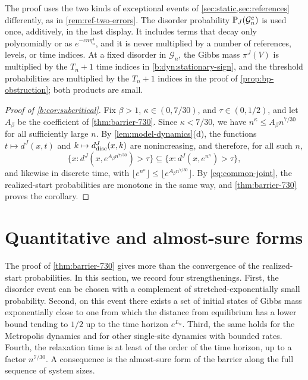 The proof uses the two kinds of exceptional events of \cref{sec:static,sec:references} differently, as in \cref{rem:ref-two-errors}. The disorder probability $\mathbb P_J(\mathcal G_n^c)$ is used once, additively, in the last display. It includes terms that decay only polynomially or as $e^{-cn\eta_n^4}$, and it is never multiplied by a number of references, levels, or time indices. At a fixed disorder in $\mathcal G_n$, the Gibbs mass $\pi^J(V)$ is multiplied by the $T_n+1$ time indices in \eqref{b:dyn:stationary-sign}, and the threshold probabilities are multiplied by the $T_n+1$ indices in the proof of \cref{prop:bp-obstruction}; both products are small.

\begin{proof}[Proof of \cref{b:cor:subcritical}]
Fix $\beta>1$, $\kappa\in(0,7/30)$, and $\tau\in(0,1/2)$, and let $A_\beta$ be the coefficient of \cref{thm:barrier-730}. Since $\kappa<7/30$, we have $n^\kappa\le A_\beta n^{7/30}$ for all sufficiently large $n$. By \cref{lem:model-dynamics}(d), the functions $t\mapsto d^J(x,t)$ and $k\mapsto d^J_{\rm disc}(x,k)$ are nonincreasing, and therefore, for all such $n$,
\[
 \bigl\{x:d^J(x,e^{A_\beta n^{7/30}})>\tau\bigr\}\subseteq\bigl\{x:d^J(x,e^{n^\kappa})>\tau\bigr\},
\]
and likewise in discrete time, with $\lfloor e^{n^\kappa}\rfloor\le\lfloor e^{A_\beta n^{7/30}}\rfloor$. By \eqref{eq:common-joint}, the realized-start probabilities are monotone in the same way, and \cref{thm:barrier-730} proves the corollary.
\end{proof}

\section{Quantitative and almost-sure forms}\label{sec:bp-strong}

The proof of \cref{thm:barrier-730} gives more than the convergence of the realized-start probabilities. In this section, we record four strengthenings. First, the disorder event can be chosen with a complement of stretched-exponentially small probability. Second, on this event there exists a set of initial states of Gibbs mass exponentially close to one from which the distance from equilibrium has a lower bound tending to $1/2$ up to the time horizon $e^{L_n}$. Third, the same holds for the Metropolis dynamics and for other single-site dynamics with bounded rates. Fourth, the relaxation time is at least of the order of the time horizon, up to a factor $n^{7/30}$. A consequence is the almost-sure form of the barrier along the full sequence of system sizes.

